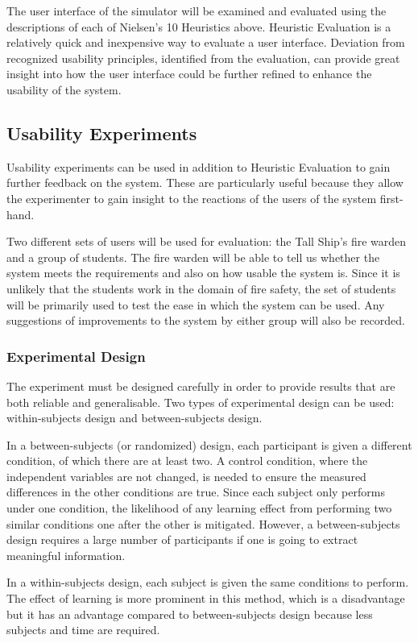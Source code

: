 The user interface of the simulator will be examined and evaluated using the descriptions of each of Nielsen's 10 Heuristics above. Heuristic Evaluation is a relatively quick and inexpensive way to evaluate a user interface. Deviation from recognized usability principles, identified from the evaluation, can provide great insight into how the user interface could be further refined to enhance the usability of the system.

\subsection{Usability Experiments}
Usability experiments can be used in addition to Heuristic Evaluation to gain further feedback on the system. These are particularly useful because they allow the experimenter to gain insight to the reactions of the users of the system first-hand.

Two different sets of users will be used for evaluation: the Tall Ship's fire warden and a group of students. The fire warden will be able to tell us whether the system meets the requirements and also on how usable the system is. Since it is unlikely that the students work in the domain of fire safety, the set of students will be primarily used to test the ease in which the system can be used. Any suggestions of improvements to the system by either group will also be recorded.

\subsubsection{Experimental Design}
The experiment must be designed carefully in order to provide results that are both reliable and generalisable. Two types of experimental design can be used: within-subjects design and between-subjects design.

In a between-subjects (or randomized) design, each participant is given a different condition, of which there are at least two. A control condition, where the independent variables are not changed, is needed to ensure the measured differences in the other conditions are true. Since each subject only performs under one condition, the likelihood of any learning effect from performing two similar conditions one after the other is mitigated. However, a between-subjects design requires a large number of participants if one is going to extract meaningful information.

In a within-subjects design, each subject is given the same conditions to perform. The effect of learning is more prominent in this method, which is a disadvantage but it has an advantage compared to between-subjects design because less subjects and time are required.


